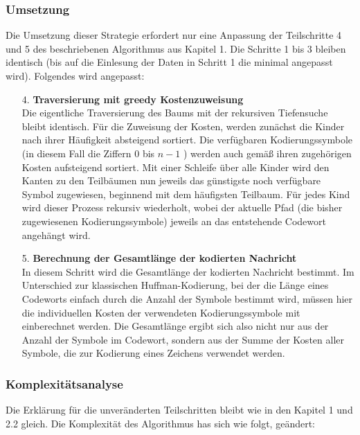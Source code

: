 \documentclass[a4paper,10pt,ngerman]{scrartcl}
\begin{document}
\subsubsection{Umsetzung}
Die Umsetzung dieser Strategie erfordert nur eine Anpassung der Teilschritte 4 und 5 des beschriebenen Algorithmus aus Kapitel 1. Die Schritte 1 bis 3 bleiben identisch (bis auf die Einlesung der Daten in Schritt 1 die minimal angepasst wird). Folgendes wird angepasst:

\begin{enumerate}
  \item [4.] \textbf{Traversierung mit greedy Kostenzuweisung}\\
  Die eigentliche Traversierung des Baums mit der rekursiven Tiefensuche bleibt identisch. Für die Zuweisung der Kosten, werden zunächst die Kinder nach ihrer Häufigkeit absteigend sortiert. Die verfügbaren Kodierungssymbole (in diesem Fall die Ziffern $0$ bis $n-1$ ) werden auch gemäß ihren zugehörigen Kosten aufsteigend sortiert. Mit einer Schleife über alle Kinder wird den Kanten zu den Teilbäumen nun jeweils das günstigste noch verfügbare Symbol zugewiesen, beginnend mit dem häufigsten Teilbaum. Für jedes Kind wird dieser Prozess rekursiv wiederholt, wobei der aktuelle Pfad (die bisher zugewiesenen Kodierungssymbole) jeweils an das entstehende Codewort angehängt wird. 
  \item[5.] \textbf{Berechnung der Gesamtlänge der kodierten Nachricht}\\
  In diesem Schritt wird die Gesamtlänge der kodierten Nachricht bestimmt. Im Unterschied zur klassischen Huffman-Kodierung, bei der die Länge eines Codeworts einfach durch die Anzahl der Symbole bestimmt wird, müssen hier die individuellen Kosten der verwendeten Kodierungssymbole mit einberechnet werden. Die Gesamtlänge ergibt sich also nicht nur aus der Anzahl der Symbole im Codewort, sondern aus der Summe der Kosten aller Symbole, die zur Kodierung eines Zeichens verwendet werden. 
\end{enumerate}


\subsubsection{Komplexitätsanalyse}
Die Erklärung für die unveränderten Teilschritten bleibt wie in den Kapitel 1 und 2.2 gleich. Die Komplexität des Algorithmus has sich wie folgt, geändert:

\vspace{0.2cm}
\end{document}
